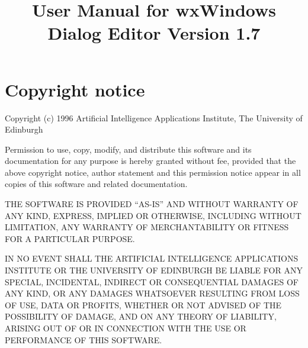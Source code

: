
\parskip=10pt
\parindent=0pt
\title{User Manual for wxWindows Dialog Editor Version 1.7}
\makeindex

\maketitle
\pagestyle{fancyplain}

\setfooter{\thepage}{}{}{}{}{\thepage}%
\tableofcontents

\chapter*{Copyright notice}
%
\setfooter{\thepage}{}{}{}{}{\thepage}%

\begin{center}
Copyright (c) 1996 Artificial Intelligence Applications Institute,
The University of Edinburgh\\
\end{center}

Permission to use, copy, modify, and distribute this software and its
documentation for any purpose is hereby granted without fee, provided that the
above copyright notice, author statement and this permission notice appear in
all copies of this software and related documentation.

THE SOFTWARE IS PROVIDED ``AS-IS'' AND WITHOUT WARRANTY OF ANY KIND, EXPRESS,
IMPLIED OR OTHERWISE, INCLUDING WITHOUT LIMITATION, ANY WARRANTY OF
MERCHANTABILITY OR FITNESS FOR A PARTICULAR PURPOSE.

IN NO EVENT SHALL THE ARTIFICIAL INTELLIGENCE APPLICATIONS INSTITUTE OR THE
UNIVERSITY OF EDINBURGH BE LIABLE FOR ANY SPECIAL, INCIDENTAL, INDIRECT OR
CONSEQUENTIAL DAMAGES OF ANY KIND, OR ANY DAMAGES WHATSOEVER RESULTING FROM
LOSS OF USE, DATA OR PROFITS, WHETHER OR NOT ADVISED OF THE POSSIBILITY OF
DAMAGE, AND ON ANY THEORY OF LIABILITY, ARISING OUT OF OR IN CONNECTION WITH
THE USE OR PERFORMANCE OF THIS SOFTWARE.







\newpage

\setfooter{\thepage}{}{}{}{}{\thepage}%
\printindex

